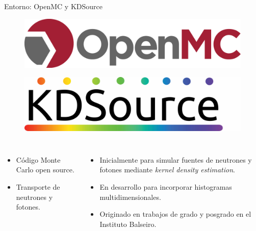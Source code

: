 \documentclass[aspectratio=169,english]{beamer}
\begin{document}
\begin{frame}{Entorno: OpenMC y KDSource}
    \begin{figure}
        \centering
        \begin{minipage}{0.35\textwidth}
            \centering
            \includegraphics[width=\linewidth]{imagens/openmc.png}
            \label{fig:openmc}
        \end{minipage}\hfill
        \begin{minipage}{0.35\textwidth}
            \centering
            \includegraphics[width=\linewidth]{imagens/esquema3.png}
            \label{fig:esquema3}
        \end{minipage}
    \end{figure}

    \begin{columns}[t]
            \begin{itemize}
                \item Código Monte Carlo open source.
                \item Transporte de neutrones y fotones.
            \end{itemize}
            \begin{itemize}
                \item Inicialmente para simular fuentes de neutrones y fotones mediante \textit{kernel density estimation}.
                \item En desarrollo para incorporar histogramas multidimensionales.
                \item Originado en trabajos de grado y posgrado en el Instituto Balseiro.
            \end{itemize}
    \end{columns}
\end{frame}
\end{document}
